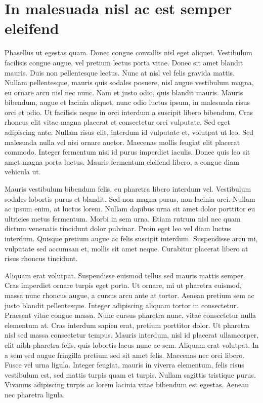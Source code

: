 \chapter{In malesuada nisl ac est semper eleifend}

Phasellus ut egestas quam. Donec congue convallis nisl eget aliquet. Vestibulum facilisis congue augue, vel pretium lectus porta vitae. Donec sit amet blandit mauris. Duis non pellentesque lectus. Nunc at nisl vel felis gravida mattis. Nullam pellentesque, mauris quis sodales posuere, nisl augue vestibulum magna, eu ornare arcu nisl nec nunc. Nam et justo odio, quis blandit mauris. Mauris bibendum, augue et lacinia aliquet, nunc odio luctus ipsum, in malesuada risus orci et odio. Ut facilisis neque in orci interdum a suscipit libero bibendum. Cras rhoncus elit vitae magna placerat et consectetur orci vulputate. Sed eget adipiscing ante. Nullam risus elit, interdum id vulputate et, volutpat ut leo. Sed malesuada nulla vel nisi ornare auctor. Maecenas mollis feugiat elit placerat commodo. Integer fermentum nisi id purus imperdiet iaculis. Donec quis leo sit amet magna porta luctus. Mauris fermentum eleifend libero, a congue diam vehicula ut.

Mauris vestibulum bibendum felis, eu pharetra libero interdum vel. Vestibulum sodales lobortis purus et blandit. Sed non magna purus, non lacinia orci. Nullam ac ipsum enim, at luctus lorem. Nullam dapibus urna sit amet dolor porttitor eu ultricies metus fermentum. Morbi in sem urna. Etiam rutrum nisl nec quam dictum venenatis tincidunt dolor pulvinar. Proin eget leo vel diam luctus interdum. Quisque pretium augue ac felis suscipit interdum. Suspendisse arcu mi, vulputate sed accumsan et, mollis sit amet neque. Curabitur placerat libero at risus rhoncus tincidunt.

Aliquam erat volutpat. Suspendisse euismod tellus sed mauris mattis semper. Cras imperdiet ornare turpis eget porta. Ut ornare, mi ut pharetra euismod, massa nunc rhoncus augue, a cursus arcu ante at tortor. Aenean pretium sem ac justo blandit pellentesque. Integer adipiscing aliquam tortor in consectetur. Praesent vitae congue massa. Nunc cursus pharetra nunc, vitae consectetur nulla elementum at. Cras interdum sapien erat, pretium porttitor dolor. Ut pharetra nisl sed massa consectetur tempus. Mauris interdum, nisl id placerat ullamcorper, elit nibh pharetra felis, quis lobortis lacus nunc ac sem. Aliquam erat volutpat. In a sem sed augue fringilla pretium sed sit amet felis. Maecenas nec orci libero. Fusce vel urna ligula. Integer feugiat, mauris in viverra elementum, felis risus vestibulum est, sed mattis turpis quam et turpis. Nullam sagittis tristique purus. Vivamus adipiscing turpis ac lorem lacinia vitae bibendum est egestas. Aenean nec pharetra ligula.

